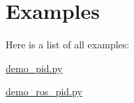 \section{Examples}
Here is a list of all examples\+:\begin{DoxyCompactItemize}
\item 
\hyperlink{demo_pid_8py-example}{demo\+\_\+pid.\+py}
\item 
\hyperlink{demo_ros_pid_8py-example}{demo\+\_\+ros\+\_\+pid.\+py}
\end{DoxyCompactItemize}

